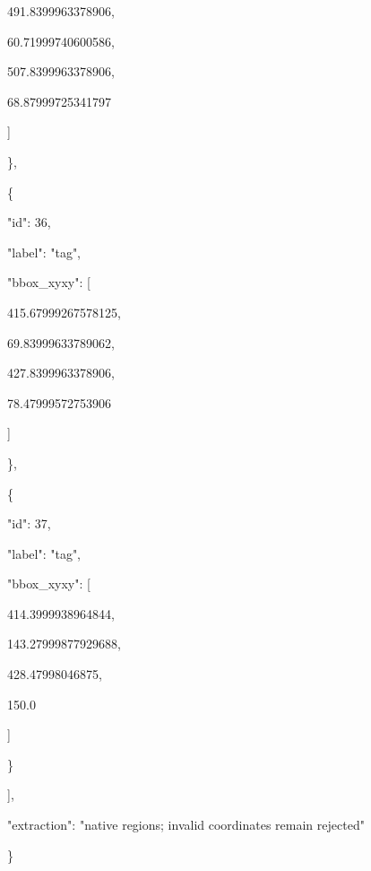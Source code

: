 \documentclass[10pt,a4paper]{article}
\begin{document}
        491.8399963378906,\allowbreak{}\par
        60.71999740600586,\allowbreak{}\par
        507.8399963378906,\allowbreak{}\par
        68.87999725341797\par
      ]\par
    \},\allowbreak{}\par
    \{\par
      "id":\allowbreak{} 36,\allowbreak{}\par
      "label":\allowbreak{} "tag",\allowbreak{}\par
      "bbox\_xyxy":\allowbreak{} [\par
        415.67999267578125,\allowbreak{}\par
        69.83999633789062,\allowbreak{}\par
        427.8399963378906,\allowbreak{}\par
        78.47999572753906\par
      ]\par
    \},\allowbreak{}\par
    \{\par
      "id":\allowbreak{} 37,\allowbreak{}\par
      "label":\allowbreak{} "tag",\allowbreak{}\par
      "bbox\_xyxy":\allowbreak{} [\par
        414.3999938964844,\allowbreak{}\par
        143.27999877929688,\allowbreak{}\par
        428.47998046875,\allowbreak{}\par
        150.0\par
      ]\par
    \}\par
  ],\allowbreak{}\par
  "extraction":\allowbreak{} "native regions; invalid coordinates remain rejected"\par
\}
\end{document}
